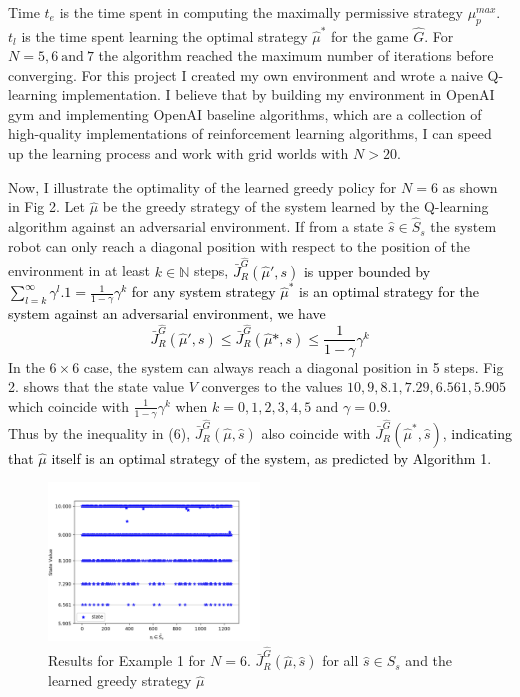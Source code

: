 \documentclass[letterpaper, 10 pt, conference]{ieeeconf}  %
\begin{document}
Time $t_e$ is the time spent in computing the maximally permissive strategy $\mu_p^{max}$.\; $t_l$ is the time spent learning the optimal strategy $\hat{\mu}^*$ for the game $\hat{G}$.  For $N = 5,6\: \text{and}\: 7$ the algorithm reached the maximum number of iterations before converging. For this project I created my own environment and wrote a naive Q-learning implementation. I believe that by building my environment in OpenAI gym\cite{c17} and implementing OpenAI baseline algorithms, which are a collection of high-quality implementations of reinforcement learning algorithms, I can speed up the learning process and work with grid worlds with $N > 20$. 

Now, I illustrate the optimality of the learned greedy policy for $N = 6$ as shown in Fig 2. Let $\hat{\mu}$ be the greedy strategy of the system learned by the Q-learning algorithm against an adversarial environment. If from a state $\hat{s} \in \hat{S}_s$ the system robot can only reach a diagonal position with respect to the position of the environment in at least $k \in \mathbb{N}$ steps, \textcolor{black}{ $\bar{J}_{R}^{\hat{G}}(\hat{\mu}', s)$ is upper bounded by $\sum_{l=k}^{\infty} \gamma^l.1 = \frac{1}{1-\gamma}\gamma^k$ for any system strategy $\hat{\mu}^*$ is an optimal strategy for the system against an adversarial environment, we have} 
\textcolor{black}{
\begin{equation}
    \bar{J}_R^{\hat{G}}(\hat{\mu}', s) \leq \bar{J}_R^{\hat{G}}(\hat{\mu}*, s) \leq 
    \frac{1}{1-\gamma}\gamma^k
\end{equation}
}
In the $6 \times 6$ case, the system can always reach a diagonal position in 5 steps. Fig 2. shows that the state value $V$ converges to the values $10,9, 8.1,7.29,6.561,5.905$ which coincide with $\frac{1}{1-\gamma}\gamma^k$ when $k = 0,1,2,3,4,5$ and $\gamma = 0.9$.\\ 

Thus by the inequality in (6), $\bar{J}_R^{\hat{G}}(\hat{\mu}, \hat{s})$ also coincide with $\bar{J}_R^{\hat{G}}(\hat{\mu}^*, \hat{s})$, \textcolor{black} {indicating that $\hat{\mu}$ itself is an optimal strategy of the system, as predicted by Algorithm 1}. \\

\begin{figure}[t]
    \centering
    \includegraphics[width=0.5\textwidth]{images/State Value_N_6.png}
    \caption{Results for Example 1 for $N = 6$. $\bar{J}_R^{\hat{G}}(\hat{\mu}, \hat{s})$ for all $\hat{s} \in \hat{S}_s$ and the learned greedy strategy $\hat{\mu}$}
\label{fig:state value N_6}
\end{figure}
\end{document}
